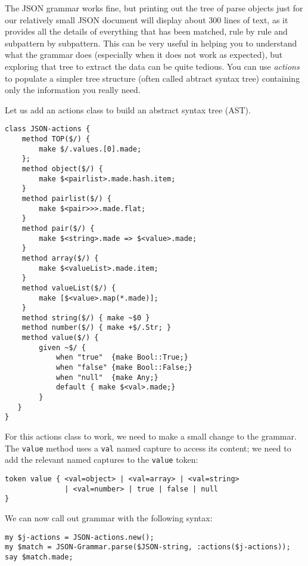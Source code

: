 The JSON grammar works fine, but printing out the tree of 
parse objects just for our relatively small JSON document 
will display about 300 lines of text, as 
it provides all the details of everything that has been 
matched, rule by rule and subpattern by subpattern. This 
can be very useful in helping you to understand what the grammar does 
(especially when it does not work as expected), but 
exploring that tree to extract the data can be quite 
tedious. You can use \emph{actions} to populate a simpler 
tree structure (often called abtract syntax tree) containing 
only the information you really need. 

Let us add an actions class to build an abstract syntax tree 
(AST).

\begin{verbatim}
class JSON-actions {
    method TOP($/) {
        make $/.values.[0].made;
    };
    method object($/) {
        make $<pairlist>.made.hash.item;
    }
    method pairlist($/) {
        make $<pair>>>.made.flat;
    }
    method pair($/) {
        make $<string>.made => $<value>.made;
    }
    method array($/) {
        make $<valueList>.made.item;
    }
    method valueList($/) {
        make [$<value>.map(*.made)];
    }
    method string($/) { make ~$0 }
    method number($/) { make +$/.Str; }
    method value($/) { 
        given ~$/ {
            when "true"  {make Bool::True;}
            when "false" {make Bool::False;}
            when "null"  {make Any;}
            default { make $<val>.made;}
        }  
   }
}
\end{verbatim}

For this actions class to work, we need to make a small change 
to the grammar. The {\tt value} method uses a {\tt val} named 
capture to access its content; we need to add the relevant 
named captures to the {\tt value} token:

\begin{verbatim}
token value { <val=object> | <val=array> | <val=string> 
              | <val=number> | true | false | null
}
\end{verbatim}

We can now call out grammar with the following syntax:

\begin{verbatim}
my $j-actions = JSON-actions.new();
my $match = JSON-Grammar.parse($JSON-string, :actions($j-actions));
say $match.made;
\end{verbatim}

